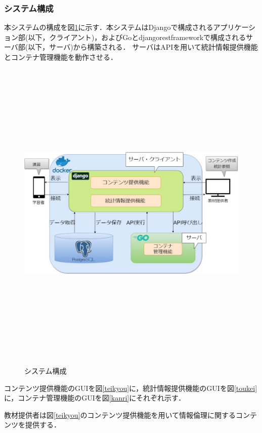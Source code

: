 \newpage
\subsubsection{システム構成}
本システムの構成を図\ref{system}に示す．本システムはDjangoで構成されるアプリケーション部(以下，クライアント)，およびGoとdjangorestframeworkで構成されるサーバ部(以下，サーバ)から構築される．
サーバはAPIを用いて統計情報提供機能とコンテナ管理機能を動作させる．

\begin{figure}[htbp]
    \begin{center}
        \includegraphics[width=16cm,height=15cm,keepaspectratio]{system-crop.pdf}\\
    \end{center}
    \caption{システム構成}
    \label{system}
\end{figure}


コンテンツ提供機能のGUIを図\ref{teikyou}に，統計情報提供機能のGUIを図\ref{toukei}に，コンテナ管理機能のGUIを図\ref{kanri}にそれぞれ示す．

\newpage
教材提供者は図\ref{teikyou}のコンテンツ提供機能を用いて情報倫理に関するコンテンツを提供する．

